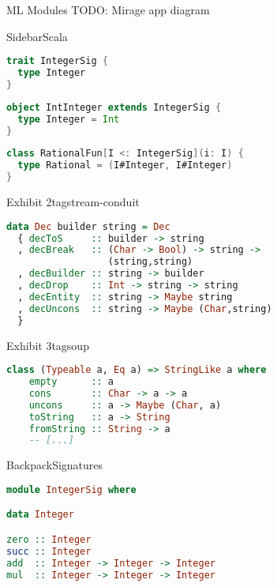 \documentclass{beamer}
\begin{document}
\begin{frame}{ML Modules}
TODO: Mirage app diagram
\end{frame}

\begin{frame}[fragile]{Sidebar}{Scala}
\begin{lstlisting}[language=Scala,title=trait \textasciitilde\ signature]
trait IntegerSig {
  type Integer
}
\end{lstlisting}
\begin{lstlisting}[language=Scala,title=object \textasciitilde\ structure]
object IntInteger extends IntegerSig {
  type Integer = Int
}
\end{lstlisting}
\begin{lstlisting}[language=Scala,title=class \textasciitilde\ functor]
class RationalFun[I <: IntegerSig](i: I) {
  type Rational = (I#Integer, I#Integer)
}
\end{lstlisting}
\end{frame}

\begin{frame}[fragile]{Exhibit 2}{tagstream-conduit}
\begin{lstlisting}[language=Haskell]
data Dec builder string = Dec
  { decToS     :: builder -> string
  , decBreak   :: (Char -> Bool) -> string ->
                  (string,string)
  , decBuilder :: string -> builder
  , decDrop    :: Int -> string -> string
  , decEntity  :: string -> Maybe string
  , decUncons  :: string -> Maybe (Char,string)
  }
\end{lstlisting}
\end{frame}

\begin{frame}[fragile]{Exhibit 3}{tagsoup}
\begin{lstlisting}[language=Haskell]
class (Typeable a, Eq a) => StringLike a where
    empty      :: a
    cons       :: Char -> a -> a
    uncons     :: a -> Maybe (Char, a)
    toString   :: a -> String
    fromString :: String -> a
    -- [...]
\end{lstlisting}
\end{frame}

\begin{frame}[fragile]{Backpack}{Signatures}
\begin{lstlisting}[language=Haskell]
module IntegerSig where

data Integer

zero :: Integer
succ :: Integer
add  :: Integer -> Integer -> Integer
mul  :: Integer -> Integer -> Integer
\end{lstlisting}
\end{frame}
\end{document}
